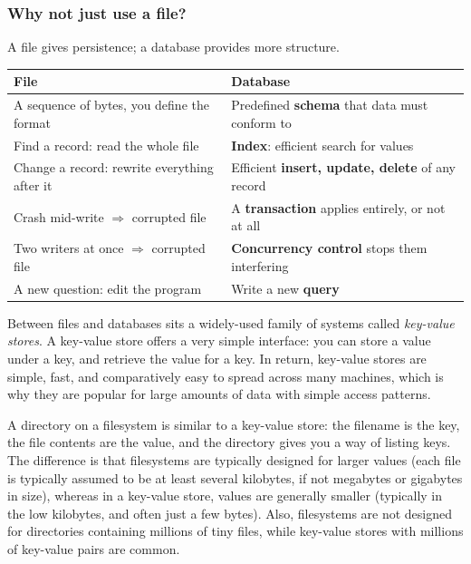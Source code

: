 \begin{frame}
    \label{s:files-vs-database}
    \frametitle{Why not just use a file?}
    A file gives persistence; a database provides more structure.\\[0.8em]
    \footnotesize
    \renewcommand{\arraystretch}{1.6}
    \begin{tabular}{p{4.85cm}|p{4.85cm}}
        \hline
        \textbf{File} & \textbf{Database} \\\hline
        A sequence of bytes, you define the format
            & Predefined \textbf{schema} that data must conform to \pause\\
        Find a record: read the whole file
            & \textbf{Index}: efficient search for values \pause\\
        Change a record: rewrite everything after it
            & Efficient \textbf{insert, update, delete} of any record \pause\\
        Crash mid-write \newline $\Rightarrow$ corrupted file
            & A \textbf{transaction} applies entirely, or not at all \pause\\
        Two writers at once \newline $\Rightarrow$ corrupted file
            & \textbf{Concurrency control} stops them interfering\pause\\
        A new question: edit the program
            & Write a new \textbf{query} \\\hline
    \end{tabular}
\end{frame}
\label{l:files-vs-database}

Between files and databases sits a widely-used family of systems called \emph{key-value stores}.
A key-value store offers a very simple interface: you can store a value under a key, and retrieve the value for a key.
In return, key-value stores are simple, fast, and comparatively easy to spread across many machines, which is why they are popular for large amounts of data with simple access patterns.

A directory on a filesystem is similar to a key-value store: the filename is the key, the file contents are the value, and the directory gives you a way of listing keys.
The difference is that filesystems are typically designed for larger values (each file is typically assumed to be at least several kilobytes, if not megabytes or gigabytes in size), whereas in a key-value store, values are generally smaller (typically in the low kilobytes, and often just a few bytes).
Also, filesystems are not designed for directories containing millions of tiny files, while key-value stores with millions of key-value pairs are common.

